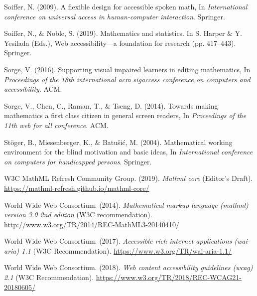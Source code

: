 \documentclass[11.5pt]{sig-alternate} %
\begin{document}
Soiffer, N. (2009). A flexible design for accessible spoken math, In \textit{International conference on universal access in human-computer interaction}. Springer.

Soiffer, N., \& Noble, S. (2019). Mathematics and statistics. In S. Harper \& Y. Yesilada (Eds.), Web accessibility—a foundation for research (pp. 417–443). Springer.

Sorge, V. (2016). Supporting visual impaired learners in editing mathematics, In \textit{Proceedings of the 18th international acm sigaccess conference on computers and accessibility}. ACM.

Sorge, V., Chen, C., Raman, T., \& Tseng, D. (2014). Towards making mathematics a first class citizen in general screen readers, In \textit{Proceedings of the 11th web for all conference}. ACM.

Stöger, B., Miesenberger, K., \& Batušić, M. (2004). Mathematical working environment for the blind motivation and basic ideas, In \textit{International conference on computers for handicapped persons}. Springer.

W3C MathML Refresh Community Group. (2019). \textit{Mathml core} (Editor’s Draft). \url{https://mathml-refresh.github.io/mathml-core/}

World Wide Web Consortium. (2014). \textit{Mathematical markup language (mathml) version 3.0 2nd edition} (W3C recommendation). \url{http://www.w3.org/TR/2014/REC-MathML3-20140410/}

World Wide Web Consortium. (2017). \textit{Accessible rich internet applications (wai-aria) 1.1} (W3C Recommendation). \url{https://www.w3.org/TR/wai-aria-1.1/}

World Wide Web Consortium. (2018). \textit{Web content accessibility guidelines (wcag) 2.1} (W3C Recommendation). 
\url{https://www.w3.org/TR/2018/REC-WCAG21-20180605/}
\end{document}
